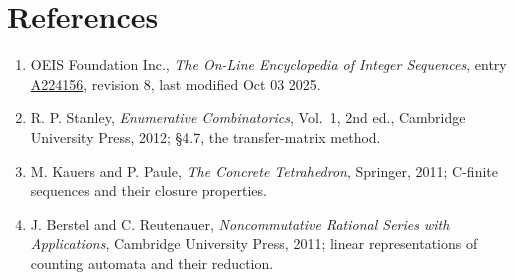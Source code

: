 \documentclass[11pt]{article}
\theoremstyle{definition}
\begin{document}
\section{References}

\begin{enumerate}

\item OEIS Foundation Inc., \emph{The On-Line Encyclopedia of Integer Sequences}, entry \href{https://oeis.org/A224156}{A224156}, revision 8, last modified Oct 03 2025.

\item R. P. Stanley, \emph{Enumerative Combinatorics}, Vol.~1, 2nd ed., Cambridge University Press, 2012; \S4.7, the transfer-matrix method.

\item M. Kauers and P. Paule, \emph{The Concrete Tetrahedron}, Springer, 2011; C-finite sequences and their closure properties.

\item J. Berstel and C. Reutenauer, \emph{Noncommutative Rational Series with Applications}, Cambridge University Press, 2011; linear representations of counting automata and their reduction.

\end{enumerate}
\end{document}
